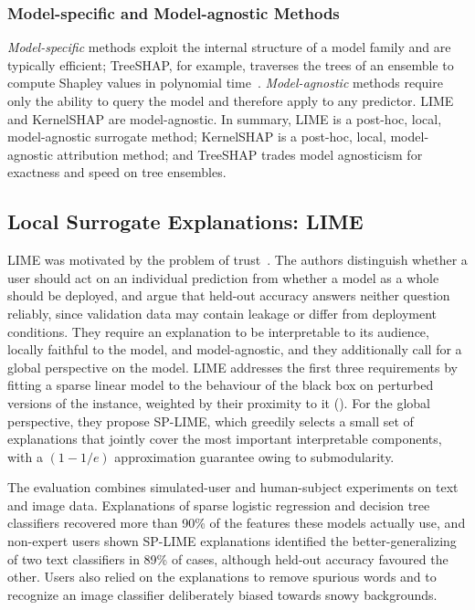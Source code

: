 \subsubsection{Model-specific and Model-agnostic Methods}
\textit{Model-specific} methods exploit the internal structure of a model family and are typically efficient; TreeSHAP, for example, traverses the trees of an ensemble to compute Shapley values in polynomial time~\cite{lundberg2018consistent}. \textit{Model-agnostic} methods require only the ability to query the model and therefore apply to any predictor. LIME and KernelSHAP are model-agnostic. In summary, LIME is a post-hoc, local, model-agnostic surrogate method; KernelSHAP is a post-hoc, local, model-agnostic attribution method; and TreeSHAP trades model agnosticism for exactness and speed on tree ensembles.

\subsection{Local Surrogate Explanations: LIME}
\label{sec:review-lime}

LIME was motivated by the problem of trust~\cite{ribeiro-etal-2016-trust}. The authors distinguish whether a user should act on an individual prediction from whether a model as a whole should be deployed, and argue that held-out accuracy answers neither question reliably, since validation data may contain leakage or differ from deployment conditions. They require an explanation to be interpretable to its audience, locally faithful to the model, and model-agnostic, and they additionally call for a global perspective on the model. LIME addresses the first three requirements by fitting a sparse linear model to the behaviour of the black box on perturbed versions of the instance, weighted by their proximity to it (). For the global perspective, they propose SP-LIME, which greedily selects a small set of explanations that jointly cover the most important interpretable components, with a $(1 - 1/e)$ approximation guarantee owing to submodularity.

The evaluation combines simulated-user and human-subject experiments on text and image data. Explanations of sparse logistic regression and decision tree classifiers recovered more than 90\% of the features these models actually use, and non-expert users shown SP-LIME explanations identified the better-generalizing of two text classifiers in 89\% of cases, although held-out accuracy favoured the other. Users also relied on the explanations to remove spurious words and to recognize an image classifier deliberately biased towards snowy backgrounds.

